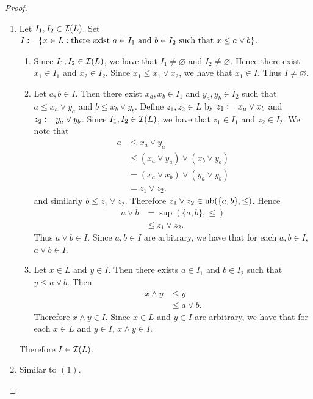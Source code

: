 \documentclass{book}
\begin{document}
	\begin{proof}\
		\begin{enumerate}
			\item Let $I_1, I_2 \in \mathcal{I}(L)$. Set $I \vcentcolon= \{x \in L: \text{there exist $a \in I_1$ and $b \in I_2$ such that $x \leq a \vee b$} \}$. 
			\begin{enumerate}
				\item Since $I_1, I_2 \in \mathcal{I}(L)$, we have that $I_1 \neq \varnothing$ and $I_2 \neq \varnothing$. Hence there exist $x_1 \in I_1$ and $x_2 \in I_2$. Since $x_1 \leq x_1 \vee x_2$, we have that $x_1 \in I$. Thus $I \neq \varnothing$. 
				\item Let $a,b \in I$. Then there exist $x_a, x_b \in I_1$ and $y_a, y_b \in I_2$ such that $a \leq x_a \vee y_a$ and $b \leq x_b \vee y_b$. Define $z_1, z_2 \in L$ by $z_1 \vcentcolon= x_a \vee x_b$ and $z_2 \vcentcolon= y_a \vee y_b$. Since $I_1, I_2 \in \mathcal{I}(L)$, we have that $z_1 \in I_1$ and $z_2 \in I_2$. We note that
				\begin{align*}
					a 
					& \leq x_a \vee y_a \\
					& \leq (x_a \vee y_a) \vee (x_b \vee y_b) \\
					& = (x_a \vee x_b) \vee (y_a \vee y_b) \\
					& = z_1 \vee z_2.
				\end{align*}
				and similarly $b \leq z_1 \vee z_2$. Therefore $z_1 \vee z_2 \in \operatorname{ub}(\{a, b\}, \leq)$. Hence
				\begin{align*}
					a \vee b
					& = \sup(\{a, b\}, \leq) \\
					& \leq z_1 \vee z_2.
				\end{align*}
				Thus $a \vee b \in I$. Since $a,b \in I$ are arbitrary, we have that for each $a,b \in I$, $a \vee b \in I$. 
				\item Let $x \in L$ and $y \in I$. Then there exists $a \in I_1$ and $b \in I_2$ such that $y \leq a \vee b$. Then 
				\begin{align*}
					x \wedge y
					& \leq y \\
					& \leq a \vee b. 
				\end{align*}
				Therefore $x \wedge y \in I$. Since $x \in L$ and $y \in I$ are arbitrary, we have that for each $x \in L$ and $y \in I$, $x \wedge y \in I$. 
			\end{enumerate}
			Therefore $I \in \mathcal{I}(L)$.
			\item Similar to $(1)$. 
		\end{enumerate}
	\end{proof}
	
\end{document}
